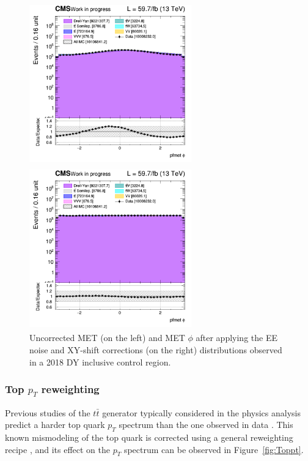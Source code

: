 \documentclass[a4paper, 10pt, openright]{report}
\begin{document}
\begin{figure}[htbp]
\centering
\begin{minipage}[b]{.49\textwidth}
\includegraphics[width=7cm, height=7cm]{figs/2018/log_cratio_inclusiveCR_ll_pfmet_phi.png}
\end{minipage}\hfill
\begin{minipage}[b]{.49\textwidth}
\includegraphics[width=7cm, height=7cm]{figs/2018/log_cratio_inclusiveCR_ll_METcorrected_phi.png}
\end{minipage} \hfill
\caption{Uncorrected MET (on the left) and MET $\phi$ after applying the EE noise and XY-shift corrections (on the right) distributions observed in a 2018 \ac{DY} inclusive control region.}
\label{fig:metCorrEffect}
\end{figure}

\subsubsection*{Top $p_T$ reweighting} \label{subsection:toppt}

Previous studies of the $t \bar t$ generator typically considered in the physics analysis predict a harder top quark $p_T$ spectrum than the one observed in data \cite{topPt}. This known mismodeling of the top quark is corrected using a general reweighting recipe \cite{TopPtRecipe}, and its effect on the $p_T$ spectrum can be observed in Figure~\ref{fig:Toppt}.
\end{document}
